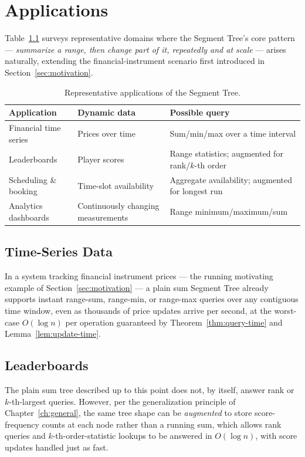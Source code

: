 \documentclass[
  11pt,
  a4paper,
  twoside=false,
  numbers=noenddot,
  headings=big,
  parskip=half,
  toc=bibliography,
  toc=listof,
  bibliography=totoc
]{scrreprt}
\newcounter{example}[chapter]
\newcommand{\Oh}[1]{O\!\left(#1\right)}
\newcommand{\tblhead}[1]{\textbf{\sffamily #1}}
\begin{document}
\chapter{Applications}
\label{ch:applications}

Table~\ref{tab:applications} surveys representative domains where the Segment Tree's core pattern --- \emph{summarize a range, then change part of it, repeatedly and at scale} --- arises naturally, extending the financial-instrument scenario first introduced in Section~\ref{sec:motivation}.

\begin{table}[h]
\centering
\caption{Representative applications of the Segment Tree.}
\label{tab:applications}
\begin{tabular}{>{\raggedright\arraybackslash}p{3.1cm}>{\raggedright\arraybackslash}p{4.2cm}p{5.3cm}}
\toprule
\tblhead{Application} & \tblhead{Dynamic data} & \tblhead{Possible query} \\
\midrule
Financial time series & Prices over time & Sum/min/max over a time interval \\
Leaderboards & Player scores & Range statistics; augmented for rank/$k$-th order \\
Scheduling \& booking & Time-slot availability & Aggregate availability; augmented for longest run \\
Analytics dashboards & Continuously changing measurements & Range minimum/maximum/sum \\
\bottomrule
\end{tabular}
\end{table}

\section{Time-Series Data}
In a system tracking financial instrument prices --- the running motivating example of Section~\ref{sec:motivation} --- a plain sum Segment Tree already supports instant range-sum, range-min, or range-max queries over any contiguous time window, even as thousands of price updates arrive per second, at the worst-case $\Oh{\log n}$ per operation guaranteed by Theorem~\ref{thm:query-time} and Lemma~\ref{lem:update-time}.

\section{Leaderboards}
The plain sum tree described up to this point does not, by itself, answer rank or $k$-th-largest queries. However, per the generalization principle of Chapter~\ref{ch:general}, the same tree shape can be \emph{augmented} to store score-frequency counts at each node rather than a running sum, which allows rank queries and $k$-th-order-statistic lookups to be answered in $\Oh{\log n}$, with score updates handled just as fast.
\end{document}
